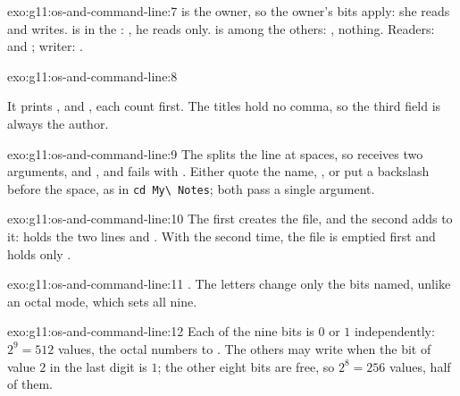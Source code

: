 \begin{solution}{exo:g11:os-and-command-line:7}
 is the owner, so the owner's bits  apply: she reads and writes.  is in the :
, he reads only.  is among the others: \code{---}, nothing. Readers:  and ;
writer: .
\end{solution}

\begin{solution}{exo:g11:os-and-command-line:8}
\smallskip\noindent\hspace*{2em}

\smallskip\noindent It prints ,  and , each count
first. The titles hold no comma, so the third field is always the author.
\end{solution}

\begin{solution}{exo:g11:os-and-command-line:9}
The  splits the line at spaces, so  receives two arguments,  and , and fails with
. Either quote the name, , or put a backslash before the space, as in
\texttt{cd My\textbackslash{} Notes}; both pass a single argument.
\end{solution}

\begin{solution}{exo:g11:os-and-command-line:10}
The first \code{>>} creates the file, and the second adds to it:  holds the two lines  and
. With \code{>} the second time, the file is emptied first and holds only .
\end{solution}

\begin{solution}{exo:g11:os-and-command-line:11}
. The letters change only the bits named, unlike an octal mode, which sets all nine.
\end{solution}

\begin{solution}{exo:g11:os-and-command-line:12}
Each of the nine bits is $0$ or $1$ independently: $2^9 = 512$ values, the octal numbers  to .
The others may write when the bit of value $2$ in the last digit is $1$; the other eight bits are free, so
$2^8 = 256$ values, half of them.
\end{solution}

